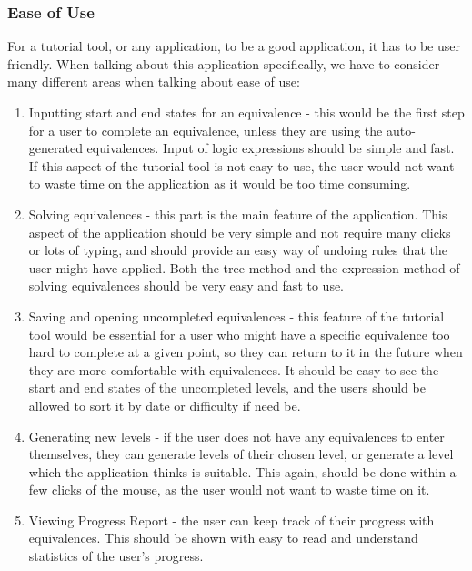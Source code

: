\documentclass[12pt]{article}
\begin{document}
\subsubsection{Ease of Use}
For a tutorial tool, or any application, to be a good application, it has to be
user friendly. When talking about this application specifically, we have to
consider many different areas when talking about ease of use:
\begin{enumerate}
  \item Inputting start and end states for an equivalence - this would be the
         first step for a user to complete an equivalence, unless they are using
         the auto-generated equivalences. Input of logic expressions should be
         simple and fast. If this aspect of the tutorial tool is not easy to use,
         the user would not want to waste time on the application as it would be
         too time consuming.
  \item Solving equivalences - this part is the main feature of the application.
         This aspect of the application should be very simple and not require many
         clicks or lots of typing, and should provide an easy way of undoing rules
         that the user might have applied. Both the tree method and the expression
         method of solving equivalences should be very easy and fast to use.
  \item Saving and opening uncompleted equivalences - this feature of the tutorial
         tool would be essential for a user who might have a specific equivalence 
         too hard to complete at a given point, so they can return to it in the
         future when they are more comfortable with equivalences. It should
         be easy to see the start and end states of the uncompleted levels, and
         the users should be allowed to sort it by date or difficulty if need be.
  \item Generating new levels - if the user does not have any equivalences to 
         enter themselves, they can generate levels of their chosen level, or
         generate a level which the application thinks is suitable. This again,
         should be done within a few clicks of the mouse, as the user would not
         want to waste time on it.
  \item Viewing Progress Report - the user can keep track of their progress with
         equivalences. This should be shown with easy to read and understand
         statistics of the user's progress. 
\end{enumerate}
\end{document}
